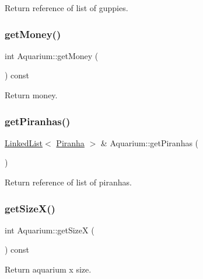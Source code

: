 Return reference of list of guppies. 

\mbox{\label{class_aquarium_a313caeabfcd5936c3982a6642b5c7e2f}} 
\subsubsection{\texorpdfstring{get\+Money()}{getMoney()}}
{\footnotesize\ttfamily int Aquarium\+::get\+Money (\begin{DoxyParamCaption}{ }\end{DoxyParamCaption}) const}



Return money. 

\mbox{\label{class_aquarium_af6c1da11d3952590634655e81d9a4eba}} 
\subsubsection{\texorpdfstring{get\+Piranhas()}{getPiranhas()}}
{\footnotesize\ttfamily \mbox{\hyperlink{class_linked_list}{Linked\+List}}$<$ \mbox{\hyperlink{class_piranha}{Piranha}} $>$ \& Aquarium\+::get\+Piranhas (\begin{DoxyParamCaption}{ }\end{DoxyParamCaption})}



Return reference of list of piranhas. 

\mbox{\label{class_aquarium_ab81986af33708a95c309a10a0f317058}} 
\subsubsection{\texorpdfstring{get\+Size\+X()}{getSizeX()}}
{\footnotesize\ttfamily int Aquarium\+::get\+SizeX (\begin{DoxyParamCaption}{ }\end{DoxyParamCaption}) const}



Return aquarium x size. 

\mbox{\label{class_aquarium_a0384a8e32a1e61baf38e09925ffaed96}} 
